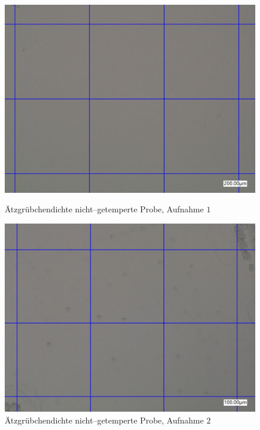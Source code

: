 \documentclass[12pt,a4paper]{scrartcl}
\numberwithin{equation}{section} %
\begin{document}
\begin{figure}[ht]
	\begin{minipage}[t]{.5\linewidth}
		\includegraphics[width=\textwidth]{../media/B2.8/Dichte1_not_tempered.pdf}
		\caption{Ätzgrübchendichte nicht--getemperte Probe, Aufnahme $1$}
		\label{abb:dichte_nt_1}
	\end{minipage}
	\begin{minipage}[t]{.5\linewidth}
		\includegraphics[width=\textwidth]{../media/B2.8/Dichte2_not_tempered.pdf}
		\caption{Ätzgrübchendichte nicht--getemperte Probe, Aufnahme $2$}
		\label{abb:dichte_nt_2}
	\end{minipage}
\end{figure}
\end{document}
